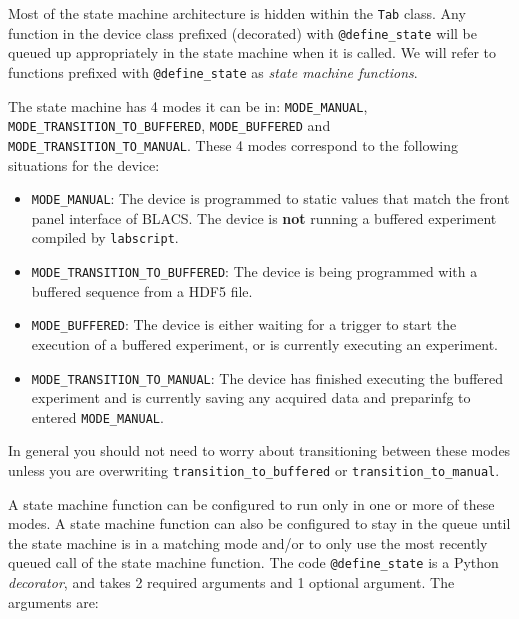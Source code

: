 \documentclass[12pt]{article}
\begin{document}
Most of the state machine architecture is hidden within the \texttt{Tab} class. 
Any function in the device class prefixed (decorated) with \texttt{@define\_state} will be queued up appropriately in the state machine when it is called.
We will refer to functions prefixed with \texttt{@define\_state} as \textit{state machine functions}.

The state machine has 4 modes it can be in: \texttt{MODE\_MANUAL}, \texttt{MODE\_TRANSITION\_TO\_BUFFERED}, \texttt{MODE\_BUFFERED} and \texttt{MODE\_TRANSITION\_TO\_MANUAL}. These 4 modes correspond to the following situations for the device:

\begin{itemize}
	\item \texttt{MODE\_MANUAL}: The device is programmed to static values that match the front panel interface of BLACS. The device is \textbf{not} running a buffered experiment compiled by \texttt{labscript}.
	\item \texttt{MODE\_TRANSITION\_TO\_BUFFERED}: The device is being programmed with a buffered sequence from a HDF5 file.
	\item \texttt{MODE\_BUFFERED}: The device is either waiting for a trigger to start the execution of a buffered experiment, or is currently executing an experiment.
	\item \texttt{MODE\_TRANSITION\_TO\_MANUAL}: The device has finished executing the buffered experiment and is currently saving any acquired data and preparinfg to entered \texttt{MODE\_MANUAL}.
\end{itemize}

In general you should not need to worry about transitioning between these modes unless you are overwriting \texttt{transition\_to\_buffered} or \texttt{transition\_to\_manual}.

A state machine function can be configured to run only in one or more of these modes.
A state machine function can also be configured to stay in the queue until the state machine is in a matching mode and/or to only use the most recently queued  call of the state machine function.
The code \texttt{@define\_state} is a Python \textit{decorator}, and takes 2 required arguments and 1 optional argument.
The arguments are:
\end{document}
